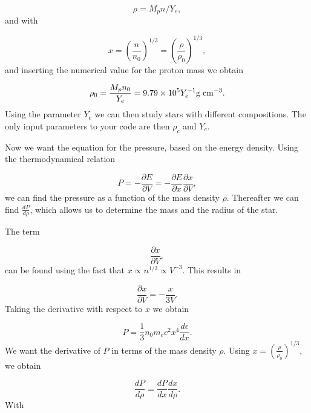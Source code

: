 \documentclass[%
oneside,                 %
final,                   %
10pt]{article}
\begin{document}
\begin{equation*}
\rho = M_p n/Y_e,
\end{equation*}
and with

\begin{equation*}
x=\left(\frac{n}{n_{0}}\right)^{1/3}=\left(\frac{\rho}{\rho_{0}}\right)^{1/3},
\end{equation*}
and inserting the numerical value for the proton mass we obtain

\begin{equation*}
\rho_{0}=\frac{M_{p}n_{0}}{Y_{e}}=9.79\times 10^{5}Y_{e}^{-1} \mathrm{g}\hspace{1mm}
\mathrm{cm}^{-3}.
\end{equation*}
Using the parameter $Y_{e}$ we can then study stars with different compositions.
The only input parameters to your code are then $\rho_c$ and $Y_e$.

Now we want the equation for the pressure, based on the energy density.
Using the thermodynamical relation

\begin{equation*}
P=-\frac{\partial E}{\partial V}=-\frac{\partial E}{\partial x}
\frac{\partial x}{\partial V},
\end{equation*}
we can find the pressure as a function of the mass density $\rho$.
Thereafter we can find $\frac{dP}{d\rho}$, which allows us to 
determine the mass and the radius of the star. 

The term

\begin{equation*}
\frac{\partial x}{\partial V},
\end{equation*}
can be found using the fact that  $x\propto n^{1/3} \propto V^{-3}$. This results in

\begin{equation*}
\frac{\partial x}{\partial V}= -\frac{x}{3V}.
\end{equation*}
Taking the derivative with respect to $x$ we obtain

\begin{equation*}
P=\frac{1}{3}n_0m_ec^2 x^4\frac{d\epsilon}{dx}.
\end{equation*}
We want the derivative of  $P$ in terms of the mass density $\rho$. Using
$x=\left(\frac{\rho}{\rho_{0}}\right)^{1/3}$, we obtain

\begin{equation*}
\frac{dP}{d\rho}=\frac{dP}{dx}\frac{dx}{d\rho}.
\end{equation*}
With
\end{document}

